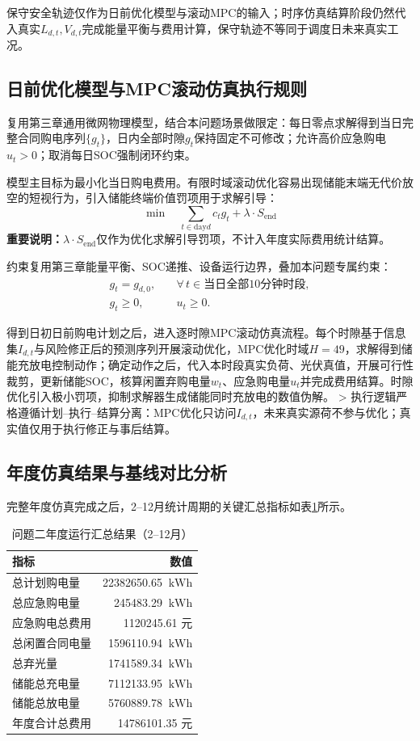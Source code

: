 保守安全轨迹仅作为日前优化模型与滚动MPC的输入；时序仿真结算阶段仍然代入真实$L_{d,t},V_{d,t}$完成能量平衡与费用计算，保守轨迹不等同于调度日未来真实工况。

\subsection{日前优化模型与MPC滚动仿真执行规则}
复用第三章通用微网物理模型，结合本问题场景做限定：每日零点求解得到当日完整合同购电序列$\{g_t\}$，日内全部时隙$g_t$保持固定不可修改；允许高价应急购电$u_t>0$；取消每日SOC强制闭环约束。

模型主目标为最小化当日购电费用。有限时域滚动优化容易出现储能末端无代价放空的短视行为，引入储能终端价值罚项用于求解引导：
\begin{equation}
\min \quad \sum_{t\in\text{day}d} c_t g_t + \lambda \cdot S_{\text{end}}
\label{eq:q2obj}
\end{equation}
\textbf{重要说明：}$\lambda \cdot S_{\text{end}}$仅作为优化求解引导罚项，不计入年度实际费用统计结算。

约束复用第三章能量平衡、SOC递推、设备运行边界，叠加本问题专属约束：
\begin{align}
g_t = g_{d,0},\quad & \forall\, t\in \text{当日全部10分钟时段},\\
g_t\ge 0,\quad & u_t\ge 0.
\end{align}

得到日初日前购电计划之后，进入逐时隙MPC滚动仿真流程。每个时隙基于信息集$I_{d,t}$与风险修正后的预测序列开展滚动优化，MPC优化时域$H=49$，求解得到储能充放电控制动作；确定动作之后，代入本时段真实负荷、光伏真值，开展可行性裁剪，更新储能SOC，核算闲置弃购电量$w_t$、应急购电量$u_t$并完成费用结算。时隙优化引入极小罚项，抑制求解器生成储能同时充放电的数值伪解。
> 执行逻辑严格遵循计划--执行--结算分离：MPC优化只访问$I_{d,t}$，未来真实源荷不参与优化；真实值仅用于执行修正与事后结算。

\subsection{年度仿真结果与基线对比分析}
完整年度仿真完成之后，2--12月统计周期的关键汇总指标如表\ref{tab:q2_result_sum}所示。
\begin{table}[htbp]
\centering
\caption{问题二年度运行汇总结果（2--12月）}
\label{tab:q2_result_sum}
\begin{tabular}{lr}
\toprule
指标 & 数值 \\
\midrule
总计划购电量 & 22382650.65 $\ \mathrm{kWh}$ \\
总应急购电量 & 245483.29 $\ \mathrm{kWh}$ \\
应急购电总费用 & 1120245.61 元 \\
总闲置合同电量 & 1596110.94 $\ \mathrm{kWh}$ \\
总弃光量 & 1741589.34 $\ \mathrm{kWh}$ \\
储能总充电量 & 7112133.95 $\ \mathrm{kWh}$ \\
储能总放电量 & 5760889.78 $\ \mathrm{kWh}$ \\
年度合计总费用 & 14786101.35 元 \\
\bottomrule
\end{tabular}
\end{table}


